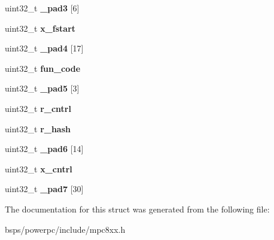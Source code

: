 \begin{DoxyCompactItemize}
\item 
\mbox{\label{structm8xxFECRegisters___a250861eaf4af68a0d4a168ee3c305cee}} 
uint32\+\_\+t {\bfseries \+\_\+pad3} \mbox{[}6\mbox{]}
\item 
\mbox{\label{structm8xxFECRegisters___a7fbb52fb739b5b649e53e08fa94a32a1}} 
uint32\+\_\+t {\bfseries x\+\_\+fstart}
\item 
\mbox{\label{structm8xxFECRegisters___ab49decc2e77a2d377b9af606846bcae2}} 
uint32\+\_\+t {\bfseries \+\_\+pad4} \mbox{[}17\mbox{]}
\item 
\mbox{\label{structm8xxFECRegisters___a5c9084cacc930ad64bf45077b9d50dfa}} 
uint32\+\_\+t {\bfseries fun\+\_\+code}
\item 
\mbox{\label{structm8xxFECRegisters___a053e04681748f797a008c51a57c0fd0c}} 
uint32\+\_\+t {\bfseries \+\_\+pad5} \mbox{[}3\mbox{]}
\item 
\mbox{\label{structm8xxFECRegisters___ac4aa2c1b9df4689ce348cb16f53447d3}} 
uint32\+\_\+t {\bfseries r\+\_\+cntrl}
\item 
\mbox{\label{structm8xxFECRegisters___ad6c103c6aa20575ed7163de181ab5ad9}} 
uint32\+\_\+t {\bfseries r\+\_\+hash}
\item 
\mbox{\label{structm8xxFECRegisters___ae867ecd80c79c5540f59770616028cd7}} 
uint32\+\_\+t {\bfseries \+\_\+pad6} \mbox{[}14\mbox{]}
\item 
\mbox{\label{structm8xxFECRegisters___aed408d407b05499144baff214742be5a}} 
uint32\+\_\+t {\bfseries x\+\_\+cntrl}
\item 
\mbox{\label{structm8xxFECRegisters___a25ac50e2ded086f730e4ed498d7752c9}} 
uint32\+\_\+t {\bfseries \+\_\+pad7} \mbox{[}30\mbox{]}
\end{DoxyCompactItemize}


The documentation for this struct was generated from the following file\+:\begin{DoxyCompactItemize}
\item 
bsps/powerpc/include/mpc8xx.\+h\end{DoxyCompactItemize}
